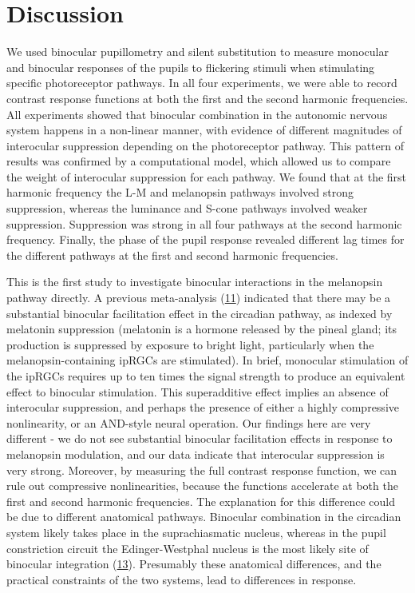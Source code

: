 \documentclass[
]{article}
\begin{document}
\hypertarget{discussion}{%
\section{Discussion}\label{discussion}}

We used binocular pupillometry and silent substitution to measure monocular and binocular responses of the pupils to flickering stimuli when stimulating specific photoreceptor pathways. In all four experiments, we were able to record contrast response functions at both the first and the second harmonic frequencies. All experiments showed that binocular combination in the autonomic nervous system happens in a non-linear manner, with evidence of different magnitudes of interocular suppression depending on the photoreceptor pathway. This pattern of results was confirmed by a computational model, which allowed us to compare the weight of interocular suppression for each pathway. We found that at the first harmonic frequency the L-M and melanopsin pathways involved strong suppression, whereas the luminance and S-cone pathways involved weaker suppression. Suppression was strong in all four pathways at the second harmonic frequency. Finally, the phase of the pupil response revealed different lag times for the different pathways at the first and second harmonic frequencies.

This is the first study to investigate binocular interactions in the melanopsin pathway directly. A previous meta-analysis (\protect\hyperlink{ref-Spitschan2019}{11}) indicated that there may be a substantial binocular facilitation effect in the circadian pathway, as indexed by melatonin suppression (melatonin is a hormone released by the pineal gland; its production is suppressed by exposure to bright light, particularly when the melanopsin-containing ipRGCs are stimulated). In brief, monocular stimulation of the ipRGCs requires up to ten times the signal strength to produce an equivalent effect to binocular stimulation. This superadditive effect implies an absence of interocular suppression, and perhaps the presence of either a highly compressive nonlinearity, or an AND-style neural operation. Our findings here are very different - we do not see substantial binocular facilitation effects in response to melanopsin modulation, and our data indicate that interocular suppression is very strong. Moreover, by measuring the full contrast response function, we can rule out compressive nonlinearities, because the functions accelerate at both the first and second harmonic frequencies. The explanation for this difference could be due to different anatomical pathways. Binocular combination in the circadian system likely takes place in the suprachiasmatic nucleus, whereas in the pupil constriction circuit the Edinger-Westphal nucleus is the most likely site of binocular integration (\protect\hyperlink{ref-Mathot2018}{13}). Presumably these anatomical differences, and the practical constraints of the two systems, lead to differences in response.
\end{document}
